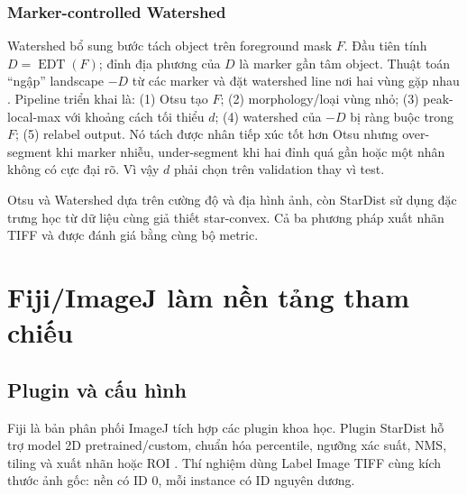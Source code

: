 \documentclass[12pt,a4paper]{report}
\begin{document}
\subsection{Marker-controlled Watershed}
Watershed bổ sung bước tách object trên foreground mask $F$. Đầu tiên tính
$D=\operatorname{EDT}(F)$; đỉnh địa phương của $D$ là marker gần tâm object.
Thuật toán ``ngập'' landscape $-D$ từ các marker và đặt watershed line nơi hai
vùng gặp nhau \citep{vincent1991watersheds}. Pipeline triển khai là: (1) Otsu
tạo $F$; (2) morphology/loại vùng nhỏ; (3) peak-local-max với khoảng cách tối
thiểu $d$; (4) watershed của $-D$ bị ràng buộc trong $F$; (5) relabel output.
Nó tách được nhân tiếp xúc tốt hơn Otsu nhưng over-segment khi marker nhiễu,
under-segment khi hai đỉnh quá gần hoặc một nhân không có cực đại rõ. Vì vậy
$d$ phải chọn trên validation thay vì test.

Otsu và Watershed dựa trên cường độ và địa hình ảnh, còn StarDist sử dụng
đặc trưng học từ dữ liệu cùng giả thiết star-convex. Cả ba phương pháp xuất
nhãn TIFF và được đánh giá bằng cùng bộ metric.

\chapter{Fiji/ImageJ làm nền tảng tham chiếu}
\section{Plugin và cấu hình}
Fiji là bản phân phối ImageJ tích hợp các plugin khoa học. Plugin StarDist hỗ
trợ model 2D pretrained/custom, chuẩn hóa percentile, ngưỡng xác suất, NMS,
tiling và xuất nhãn hoặc ROI \citep{imagej_stardist_plugin}. Thí nghiệm dùng
Label Image TIFF cùng kích thước ảnh gốc: nền có ID 0, mỗi instance có ID
nguyên dương.
\end{document}
